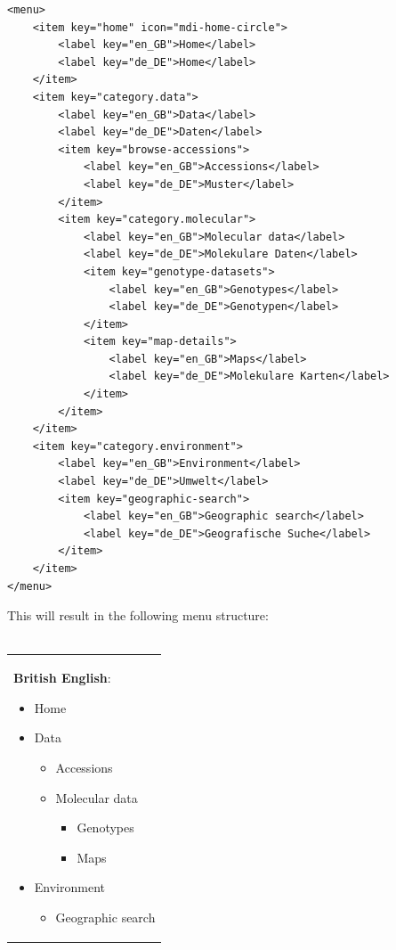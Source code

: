 \begin{lstlisting}[style=Xml]
<menu>
	<item key="home" icon="mdi-home-circle">
		<label key="en_GB">Home</label>
		<label key="de_DE">Home</label>
	</item>
	<item key="category.data">
		<label key="en_GB">Data</label>
		<label key="de_DE">Daten</label>
		<item key="browse-accessions">
			<label key="en_GB">Accessions</label>
			<label key="de_DE">Muster</label>
		</item>
		<item key="category.molecular">
			<label key="en_GB">Molecular data</label>
			<label key="de_DE">Molekulare Daten</label>
			<item key="genotype-datasets">
				<label key="en_GB">Genotypes</label>
				<label key="de_DE">Genotypen</label>
			</item>
			<item key="map-details">
				<label key="en_GB">Maps</label>
				<label key="de_DE">Molekulare Karten</label>
			</item>
		</item>
	</item>
	<item key="category.environment">
		<label key="en_GB">Environment</label>
		<label key="de_DE">Umwelt</label>
		<item key="geographic-search">
			<label key="en_GB">Geographic search</label>
			<label key="de_DE">Geografische Suche</label>
		</item>
	</item>
</menu>
\end{lstlisting}
\noindent
This will result in the following menu structure:\\
\\
\begin{tabular}[t]{@{}>{\raggedright\arraybackslash}p{}}
	\textbf{British English}:
	\begin{itemize}
		\item Home
		\item Data
		\begin{itemize}
			\item Accessions
			\item Molecular data
			\begin{itemize}
				\item Genotypes
				\item Maps
			\end{itemize}
		\end{itemize}
		\item Environment
		\begin{itemize}
			\item Geographic search	
		\end{itemize}
	\end{itemize}
\end{tabular}
